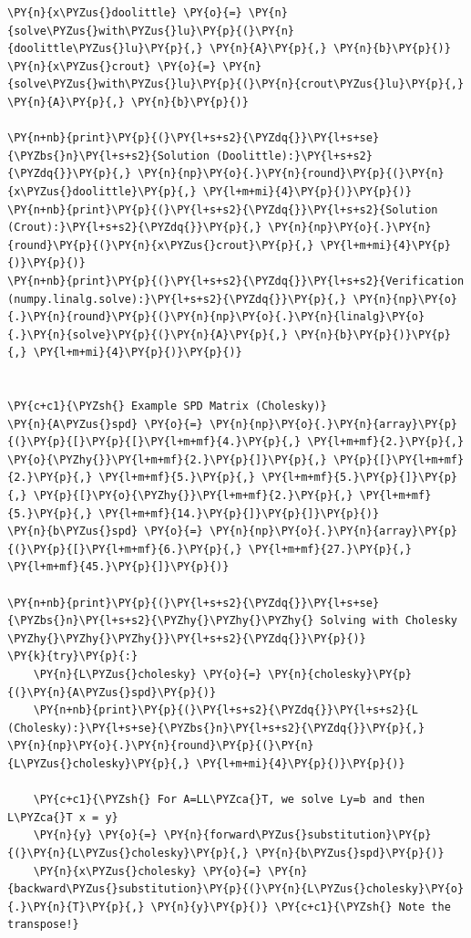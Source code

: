 \begin{Verbatim}[commandchars=\\\{\}]
\PY{n}{x\PYZus{}doolittle} \PY{o}{=} \PY{n}{solve\PYZus{}with\PYZus{}lu}\PY{p}{(}\PY{n}{doolittle\PYZus{}lu}\PY{p}{,} \PY{n}{A}\PY{p}{,} \PY{n}{b}\PY{p}{)}
\PY{n}{x\PYZus{}crout} \PY{o}{=} \PY{n}{solve\PYZus{}with\PYZus{}lu}\PY{p}{(}\PY{n}{crout\PYZus{}lu}\PY{p}{,} \PY{n}{A}\PY{p}{,} \PY{n}{b}\PY{p}{)}

\PY{n+nb}{print}\PY{p}{(}\PY{l+s+s2}{\PYZdq{}}\PY{l+s+se}{\PYZbs{}n}\PY{l+s+s2}{Solution (Doolittle):}\PY{l+s+s2}{\PYZdq{}}\PY{p}{,} \PY{n}{np}\PY{o}{.}\PY{n}{round}\PY{p}{(}\PY{n}{x\PYZus{}doolittle}\PY{p}{,} \PY{l+m+mi}{4}\PY{p}{)}\PY{p}{)}
\PY{n+nb}{print}\PY{p}{(}\PY{l+s+s2}{\PYZdq{}}\PY{l+s+s2}{Solution (Crout):}\PY{l+s+s2}{\PYZdq{}}\PY{p}{,} \PY{n}{np}\PY{o}{.}\PY{n}{round}\PY{p}{(}\PY{n}{x\PYZus{}crout}\PY{p}{,} \PY{l+m+mi}{4}\PY{p}{)}\PY{p}{)}
\PY{n+nb}{print}\PY{p}{(}\PY{l+s+s2}{\PYZdq{}}\PY{l+s+s2}{Verification (numpy.linalg.solve):}\PY{l+s+s2}{\PYZdq{}}\PY{p}{,} \PY{n}{np}\PY{o}{.}\PY{n}{round}\PY{p}{(}\PY{n}{np}\PY{o}{.}\PY{n}{linalg}\PY{o}{.}\PY{n}{solve}\PY{p}{(}\PY{n}{A}\PY{p}{,} \PY{n}{b}\PY{p}{)}\PY{p}{,} \PY{l+m+mi}{4}\PY{p}{)}\PY{p}{)}


\PY{c+c1}{\PYZsh{} Example SPD Matrix (Cholesky)}
\PY{n}{A\PYZus{}spd} \PY{o}{=} \PY{n}{np}\PY{o}{.}\PY{n}{array}\PY{p}{(}\PY{p}{[}\PY{p}{[}\PY{l+m+mf}{4.}\PY{p}{,} \PY{l+m+mf}{2.}\PY{p}{,} \PY{o}{\PYZhy{}}\PY{l+m+mf}{2.}\PY{p}{]}\PY{p}{,} \PY{p}{[}\PY{l+m+mf}{2.}\PY{p}{,} \PY{l+m+mf}{5.}\PY{p}{,} \PY{l+m+mf}{5.}\PY{p}{]}\PY{p}{,} \PY{p}{[}\PY{o}{\PYZhy{}}\PY{l+m+mf}{2.}\PY{p}{,} \PY{l+m+mf}{5.}\PY{p}{,} \PY{l+m+mf}{14.}\PY{p}{]}\PY{p}{]}\PY{p}{)}
\PY{n}{b\PYZus{}spd} \PY{o}{=} \PY{n}{np}\PY{o}{.}\PY{n}{array}\PY{p}{(}\PY{p}{[}\PY{l+m+mf}{6.}\PY{p}{,} \PY{l+m+mf}{27.}\PY{p}{,} \PY{l+m+mf}{45.}\PY{p}{]}\PY{p}{)}

\PY{n+nb}{print}\PY{p}{(}\PY{l+s+s2}{\PYZdq{}}\PY{l+s+se}{\PYZbs{}n}\PY{l+s+s2}{\PYZhy{}\PYZhy{}\PYZhy{} Solving with Cholesky \PYZhy{}\PYZhy{}\PYZhy{}}\PY{l+s+s2}{\PYZdq{}}\PY{p}{)}
\PY{k}{try}\PY{p}{:}
    \PY{n}{L\PYZus{}cholesky} \PY{o}{=} \PY{n}{cholesky}\PY{p}{(}\PY{n}{A\PYZus{}spd}\PY{p}{)}
    \PY{n+nb}{print}\PY{p}{(}\PY{l+s+s2}{\PYZdq{}}\PY{l+s+s2}{L (Cholesky):}\PY{l+s+se}{\PYZbs{}n}\PY{l+s+s2}{\PYZdq{}}\PY{p}{,} \PY{n}{np}\PY{o}{.}\PY{n}{round}\PY{p}{(}\PY{n}{L\PYZus{}cholesky}\PY{p}{,} \PY{l+m+mi}{4}\PY{p}{)}\PY{p}{)}

    \PY{c+c1}{\PYZsh{} For A=LL\PYZca{}T, we solve Ly=b and then L\PYZca{}T x = y}
    \PY{n}{y} \PY{o}{=} \PY{n}{forward\PYZus{}substitution}\PY{p}{(}\PY{n}{L\PYZus{}cholesky}\PY{p}{,} \PY{n}{b\PYZus{}spd}\PY{p}{)}
    \PY{n}{x\PYZus{}cholesky} \PY{o}{=} \PY{n}{backward\PYZus{}substitution}\PY{p}{(}\PY{n}{L\PYZus{}cholesky}\PY{o}{.}\PY{n}{T}\PY{p}{,} \PY{n}{y}\PY{p}{)} \PY{c+c1}{\PYZsh{} Note the transpose!}


\end{Verbatim}
